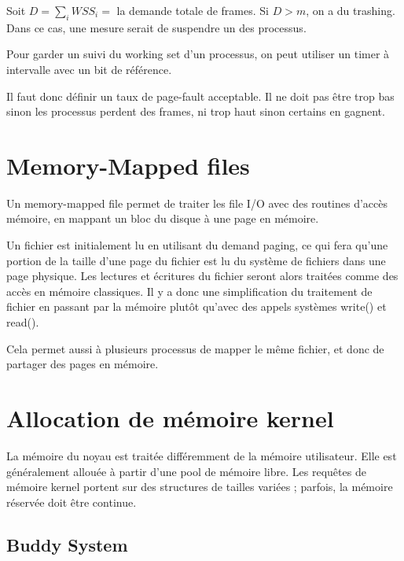 	Soit $D = \sum_i WSS_i =$ la demande totale de frames. Si $D > m$, on a du trashing. Dans ce cas, une mesure serait de suspendre un des processus.
	
	
	Pour garder un suivi du working set d'un processus, on peut utiliser un timer à intervalle avec un bit de référence.
	
	
	Il faut donc définir un taux de page-fault acceptable. Il ne doit pas être trop bas sinon les processus perdent des frames, ni trop haut sinon certains en gagnent.
	
	
	
\section{Memory-Mapped files}

Un memory-mapped file permet de traiter les file I/O avec des routines d'accès mémoire, en mappant un bloc du disque à une page en mémoire.

Un fichier est initialement lu en utilisant du demand paging, ce qui fera qu'une portion de la taille d'une page du fichier est lu du système de fichiers dans une page physique. Les lectures et écritures du fichier seront alors traitées comme des accès en mémoire classiques. Il y a donc une simplification du traitement de fichier en passant par la mémoire plutôt qu'avec des appels systèmes write() et read().

Cela permet aussi à plusieurs processus de mapper le même fichier, et donc de partager des pages en mémoire.


\section{Allocation de mémoire kernel}

La mémoire du noyau est traitée différemment de la mémoire utilisateur. Elle est généralement allouée à partir d'une pool de mémoire libre. Les requêtes de mémoire kernel portent sur des structures de tailles variées ; parfois, la mémoire réservée doit être continue.

\subsection{Buddy System}

